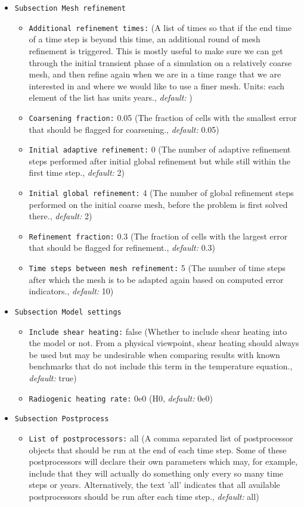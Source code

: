 \begin{itemize}
\item {\tt Subsection Mesh refinement}
\begin{itemize}
\item {\tt Additional refinement times:}  (A list of times so that if the end time of a time step is beyond this time, an additional round of mesh refinement is triggered. This is mostly useful to make sure we can get through the initial transient phase of a simulation on a relatively coarse mesh, and then refine again when we are in a time range that we are interested in and where we would like to use a finer mesh. Units: each element of the list has units years., {\it default:} )
\item {\tt Coarsening fraction:} 0.05 (The fraction of cells with the smallest error that should be flagged for coarsening., {\it default:} 0.05)
\item {\tt Initial adaptive refinement:} 0 (The number of adaptive refinement steps performed after initial global refinement but while still within the first time step., {\it default:} 2)
\item {\tt Initial global refinement:} 4 (The number of global refinement steps performed on the initial coarse mesh, before the problem is first solved there., {\it default:} 2)
\item {\tt Refinement fraction:} 0.3 (The fraction of cells with the largest error that should be flagged for refinement., {\it default:} 0.3)
\item {\tt Time steps between mesh refinement:} 5 (The number of time steps after which the mesh is to be adapted again based on computed error indicators., {\it default:} 10)
\end{itemize}

\item {\tt Subsection Model settings}
\begin{itemize}
\item {\tt Include shear heating:} false (Whether to include shear heating into the model or not. From a physical viewpoint, shear heating should always be used but may be undesirable when comparing results with known benchmarks that do not include this term in the temperature equation., {\it default:} true)
\item {\tt Radiogenic heating rate:} 0e0 (H0, {\it default:} 0e0)
\end{itemize}

\item {\tt Subsection Postprocess}
\begin{itemize}
\item {\tt List of postprocessors:} all (A comma separated list of postprocessor objects that should be run at the end of each time step. Some of these postprocessors will declare their own parameters which may, for example, include that they will actually do something only every so many time steps or years. Alternatively, the text 'all' indicates that all available postprocessors should be run after each time step., {\it default:} all)




\end{itemize}
\end{itemize}

